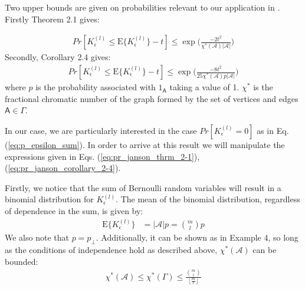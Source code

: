 Two upper bounds are given on probabilities relevant to our application in \cite{Janson2004}. Firstly Theorem 2.1 gives:

 \begin{equation}\label{eq:pr_janson_thrm_2-1}
    \begin{aligned}
        Pr[K_\epsilon^{(l)} \leq \text{E}\lbrace K_\epsilon^{(l)} \rbrace -t] \leq \exp\bigg(\frac{-2t^2}{\chi^*(\mathscr{A})\vert \mathscr{A}\vert}\bigg)
    \end{aligned}
\end{equation}
Secondly, Corollary 2.4 gives:
\begin{equation}\label{eq:pr_janson_corollary_2-4}
    \begin{aligned}
        Pr[K_\epsilon^{(l)} \leq \text{E}\lbrace K_\epsilon^{(l)} \rbrace -t] \leq \exp\bigg(\frac{-8t^2}{25\chi^*(\mathscr{A})p\vert \mathscr{A}\vert}\bigg)
    \end{aligned}
\end{equation}
where $p$ is the probability associated with $1_\mathsf{A}$ taking a value of 1. $\chi^*$ is the fractional chromatic number of the graph formed by the set of vertices and edges $\mathsf{A}\in\Gamma$.

In our case, we are particularly interested in the case $Pr[K_\epsilon^{(l)} = 0]$ as in Eq. (\ref{eq:p_epsilon_sum}). In order to arrive at this result we will manipulate the expressions given in Eqs. (\ref{eq:pr_janson_thrm_2-1}),(\ref{eq:pr_janson_corollary_2-4}). 

Firstly, we notice that the sum of Bernoulli random variables will result in a binomial distribution for $K_\epsilon^{(l)}$. The mean of the binomial distribution, regardless of dependence in the sum, is given by:
\begin{equation}\label{eq:binom_mean}
    \begin{aligned}
        \text{E}\lbrace K_\epsilon^{(l)} \rbrace &= \vert \mathscr{A} \vert p
        =\binom{m}{l}p
    \end{aligned}
\end{equation}
We also note that $p=p_\perp$. Additionally, it can be shown as in \cite{Janson2004} Example 4, so long as the conditions of independence hold as described above, $\chi^*(\mathscr{A})$ can be bounded:
\begin{equation}\label{eq:chi_bound}
    \begin{aligned}
        \chi^*(\mathscr{A})\leq\chi^*(\Gamma)\leq \frac{ \binom{m}{l}}{\lfloor \frac{m}{l} \rfloor}
    \end{aligned}
\end{equation}

